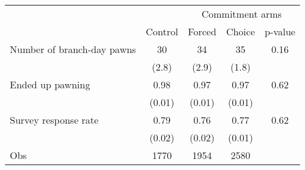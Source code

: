 \begin{tabular}{lcccc}
\toprule
      &       & \multicolumn{3}{c}{Commitment arms} \\
\cmidrule{3-5}      & Control & Forced & Choice & p-value \\
\midrule
\midrule
Number of branch-day pawns & 30    & 34    & 35    & 0.16 \\
      & (2.8) & (2.9) & (1.8) &  \\
\multicolumn{1}{p{12.82em}}{Ended up pawning} & 0.98  & 0.97  & 0.97  & 0.62 \\
      & (0.01) & (0.01) & (0.01) &  \\
Survey response rate & 0.79  & 0.76  & 0.77  & 0.62 \\
      & (0.02) & (0.02) & (0.01) &  \\
\midrule
Obs   & 1770  & 1954  & 2580  &  \\
\bottomrule
\bottomrule
\end{tabular}%
